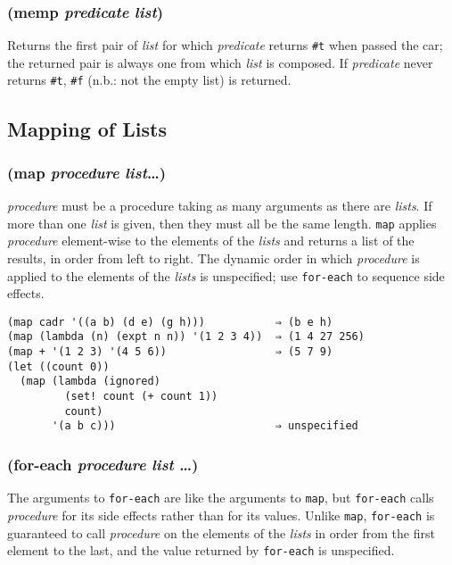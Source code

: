 \documentclass{article}
\begin{document}
\subsubsection{(memp \emph{predicate} \emph{list})}

Returns the first pair of \emph{list} for which \emph{predicate} returns \verb|#t| when
passed the car; the returned pair is always one from which \emph{list} is composed. If
\emph{predicate} never returns \verb|#t|, \verb|#f| (n.b.: not the empty list) is
returned.

\subsection{Mapping of Lists}\label{sec:mapping-of-lists}

\subsubsection{(map \emph{procedure} \emph{list}\ldots{})}

\emph{procedure} must be a procedure taking as many arguments as there are \emph{lists}. If
more than one \emph{list} is given, then they must all be the same length. \verb|map|
applies \emph{procedure} element-wise to the elements of the \emph{lists} and returns a list
of the results, in order from left to right. The dynamic order in which \emph{procedure} is
applied to the elements of the \emph{lists} is unspecified; use \verb|for-each| to sequence
side effects.

\begin{verbatim}
(map cadr '((a b) (d e) (g h)))           ⇒ (b e h)
(map (lambda (n) (expt n n)) '(1 2 3 4))  ⇒ (1 4 27 256)
(map + '(1 2 3) '(4 5 6))                 ⇒ (5 7 9)
(let ((count 0))
  (map (lambda (ignored)
         (set! count (+ count 1))
         count)
       '(a b c)))                         ⇒ unspecified
\end{verbatim}

\subsubsection{(for-each \emph{procedure} \emph{list} \ldots{})}

The arguments to \verb|for-each| are like the arguments to \verb|map|, but
\verb|for-each| calls \emph{procedure} for its side effects rather than for its values.
Unlike \verb|map|, \verb|for-each| is guaranteed to call \emph{procedure} on the elements
of the \emph{lists} in order from the first element to the last, and the value returned by
\verb|for-each| is unspecified.
\end{document}
